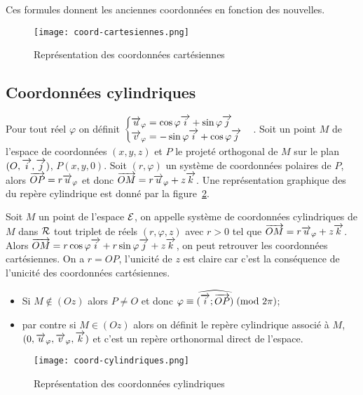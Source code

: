 \danger Ces formules donnent les \og{}anciennes\fg{} coordonnées en fonction des \og{}nouvelles\fg{}.

\begin{figure}
    \centering
    \texttt{[image: coord-cartesiennes.png]}
    \caption{Représentation des coordonnées cartésiennes}
    \label{fig:repcart}
\end{figure}

\subsection{Coordonnées cylindriques}
\label{subsec:coordcyl}
Pour tout réel \(\varphi\) on définit 
\(\begin{cases}\overrightarrow{u}_\varphi=\cos\varphi\overrightarrow{i}+\sin\varphi\overrightarrow{j}\\ 
\overrightarrow{v}_\varphi=-\sin\varphi\overrightarrow{i}+\cos\varphi\overrightarrow{j}\end{cases}\). Soit un point \(M\) de 
l'espace de coordonnées \((x,y,z)\) et \(P\) le projeté orthogonal de \(M\) sur 
le plan \((O,\overrightarrow{i},\overrightarrow{j})\), \(P(x,y,0)\). Soit \((r,\varphi)\) un système de coordonnées 
polaires de \(P\), alors \(\overrightarrow{OP}=r\overrightarrow{u}_\varphi\) et donc 
\(\overrightarrow{OM}=r\overrightarrow{u}_\varphi+z\overrightarrow{k}\). Une représentation graphique des du repère 
cylindrique est donné par la figure~\ref{fig:repcyl}.
\begin{defdef}
  Soit \(M\) un point de l'espace \(\mathcal{E}\), on appelle système de coordonnées cylindriques de \(M\) dans \(\mathcal{R}\) tout triplet de réels \((r,\varphi,z)\) avec \(r>0\) tel que \(\overrightarrow{OM}=r\overrightarrow{u}_\varphi+z\overrightarrow{k}\). Alors \(\overrightarrow{OM}=r\cos\varphi\overrightarrow{i}+r\sin\varphi\overrightarrow{j}+z\overrightarrow{k}\), on peut retrouver les coordonnées cartésiennes. On a \(r=OP\), l'unicité de \(z\) est claire car c'est la conséquence de l'unicité des coordonnées cartésiennes. 
\begin{itemize}
\item Si \(M\notin(Oz)\) alors \(P\neq O\) et donc \(\varphi \equiv \widehat{(\overrightarrow{i};\overrightarrow{OP})}\!\pmod {2\pi}\);
\item par contre si \(M\in(Oz)\) alors on définit le repère cylindrique associé à \(M\), \((0,\overrightarrow{u}_\varphi,\overrightarrow{v}_\varphi,\overrightarrow{k})\) et c'est un repère orthonormal direct de l'espace.
\end{itemize}
\end{defdef}

\begin{figure}
    \centering
    \texttt{[image: coord-cylindriques.png]}
    \caption{Représentation des coordonnées cylindriques}
    \label{fig:repcyl}
\end{figure}


